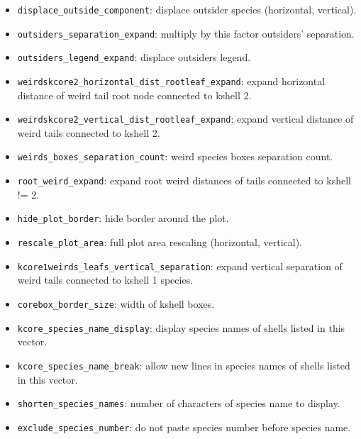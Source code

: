 \documentclass[12pt]{article}
\begin{document}
\begin{itemize}
\item \texttt{displace\_outside\_component}: displace outsider species (horizontal, vertical).

\item \texttt{outsiders\_separation\_expand}: multiply by this factor outsiders' separation.

\item \texttt{outsiders\_legend\_expand}: displace outsiders legend.

\item \texttt{weirdskcore2\_horizontal\_dist\_rootleaf\_expand}: expand horizontal distance of weird tail root node connected to kshell 2.

\item \texttt{weirdskcore2\_vertical\_dist\_rootleaf\_expand}: expand vertical distance of weird tails connected to kshell 2.

\item \texttt{weirds\_boxes\_separation\_count}: weird species boxes separation count.

\item \texttt{root\_weird\_expand}: expand root weird distances of tails connected to kshell != 2.

\item \texttt{hide\_plot\_border}: hide border around the plot.

\item \texttt{rescale\_plot\_area}: full plot area rescaling (horizontal, vertical).

\item \texttt{kcore1weirds\_leafs\_vertical\_separation}: expand vertical separation of weird tails connected to kshell 1 species.

\item \texttt{corebox\_border\_size}: width of kshell boxes.

\item \texttt{kcore\_species\_name\_display}: display species names of shells listed in this vector.

\item \texttt{kcore\_species\_name\_break}: allow new lines in species names of shells listed in this vector.

\item \texttt{shorten\_species\_names}: number of characters of species name to display.

\item \texttt{exclude\_species\_number}: do not paste species number before species name.


\end{itemize}
\end{document}
